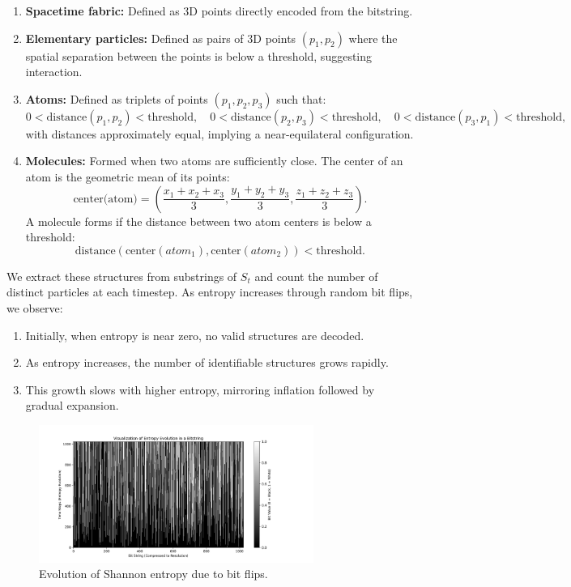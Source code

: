 \documentclass[11pt]{article}
\begin{document}
\begin{enumerate}
    \item \textbf{Spacetime fabric:} Defined as 3D points directly encoded from the bitstring.
    \item \textbf{Elementary particles:} Defined as pairs of 3D points $(p_1, p_2)$ where the spatial separation between the points is below a threshold, suggesting interaction.
    \item \textbf{Atoms:} Defined as triplets of points $(p_1, p_2, p_3)$ such that:
          \[
              0 < \text{distance}(p_1, p_2) < \text{threshold}, \quad
              0 < \text{distance}(p_2, p_3) < \text{threshold}, \quad
              0 < \text{distance}(p_3, p_1) < \text{threshold},
          \]
          with distances approximately equal, implying a near-equilateral configuration.
    \item \textbf{Molecules:} Formed when two atoms are sufficiently close. The center of an atom is the geometric mean of its points:
          \[
              \text{center(atom)} = \left( \frac{x_1 + x_2 + x_3}{3}, \frac{y_1 + y_2 + y_3}{3}, \frac{z_1 + z_2 + z_3}{3} \right).
          \]
          A molecule forms if the distance between two atom centers is below a threshold:
          \[
              \text{distance}(\text{center}(atom_1), \text{center}(atom_2)) < \text{threshold}.
          \]
\end{enumerate}

We extract these structures from substrings of $S_t$ and count the number of distinct particles at each timestep. As entropy increases through random bit flips, we observe:

\begin{enumerate}
    \item Initially, when entropy is near zero, no valid structures are decoded.
    \item As entropy increases, the number of identifiable structures grows rapidly.
    \item This growth slows with higher entropy, mirroring inflation followed by gradual expansion.
\end{enumerate}

\begin{figure}[h!]
    \centering
    \includegraphics[width=0.8\textwidth]{figures/entropy_evolution_image.png}
    \caption{Evolution of Shannon entropy due to bit flips.}
    \label{fig:entropy-evolution}
\end{figure}
\end{document}
